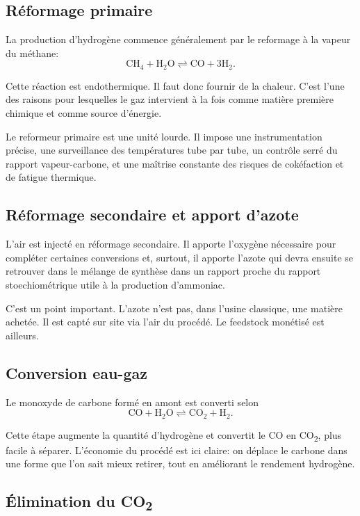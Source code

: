 \documentclass[11pt]{article}
\begin{document}
\subsection{Réformage primaire}

La production d'hydrogène commence généralement par le reformage à la vapeur du méthane:
\[
\mathrm{CH_4 + H_2O \rightleftharpoons CO + 3H_2}.
\]

Cette réaction est endothermique. Il faut donc fournir de la chaleur. C'est l'une des raisons pour lesquelles le gaz intervient à la fois comme matière première chimique et comme source d'énergie.

Le reformeur primaire est une unité lourde. Il impose une instrumentation précise, une surveillance des températures tube par tube, un contrôle serré du rapport vapeur-carbone, et une maîtrise constante des risques de cokéfaction et de fatigue thermique.

\subsection{Réformage secondaire et apport d'azote}

L'air est injecté en réformage secondaire. Il apporte l'oxygène nécessaire pour compléter certaines conversions et, surtout, il apporte l'azote qui devra ensuite se retrouver dans le mélange de synthèse dans un rapport proche du rapport stoechiométrique utile à la production d'ammoniac.

C'est un point important. L'azote n'est pas, dans l'usine classique, une matière achetée. Il est capté sur site via l'air du procédé. Le feedstock monétisé est ailleurs.

\subsection{Conversion eau-gaz}

Le monoxyde de carbone formé en amont est converti selon
\[
\mathrm{CO + H_2O \rightleftharpoons CO_2 + H_2}.
\]

Cette étape augmente la quantité d'hydrogène et convertit le CO en CO\textsubscript{2}, plus facile à séparer. L'économie du procédé est ici claire: on déplace le carbone dans une forme que l'on sait mieux retirer, tout en améliorant le rendement hydrogène.

\subsection{Élimination du CO\textsubscript{2}}
\end{document}
